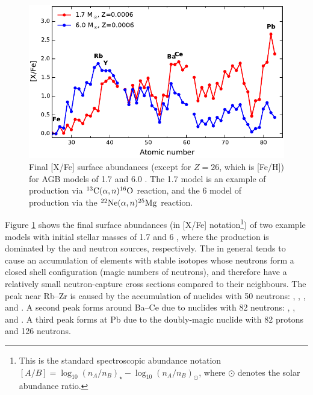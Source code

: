\begin{figure}
 \begin{center}\includegraphics[width=\textwidth]{fig-agbfinalabund.pdf}\end{center}
 \caption[{Final [X/Fe] surface abundances (except for $Z=26$, which is [Fe/H]) for AGB models of 1.7 and 6.0 \Msun.}]{Final [X/Fe] surface abundances (except for $Z=26$, which is [Fe/H]) for AGB models of 1.7 and 6.0 \Msun. The 1.7 \Msun model is an example of \sprocess production via $\mbox{${}^{13}{\text{C}}$}(\alpha,n)\mbox{${}^{16}{\text{O}}$}$ reaction, and the 6 \Msun model of production via the $\mbox{${}^{22}{\text{Ne}}$}(\alpha,n)\mbox{${}^{25}{\text{Mg}}$}$ reaction.}\label{fig:agbfinalabund}
\end{figure}

Figure \ref{fig:agbfinalabund} shows the final surface abundances (in [X/Fe] notation\footnote{This is the standard spectroscopic abundance notation $[A/B] = \log_{10} (n_A/n_B)_{\star} - \log_{10} (n_A/n_B)_{\odot}$, where $\odot$ denotes the solar abundance ratio.}) of two example models with initial stellar masses of 1.7 and 6 \Msun, where the \sprocess production is dominated by the  and  neutron sources, respectively. The \sprocess in general tends to cause an accumulation of elements with stable isotopes whose neutrons form a closed shell configuration (magic numbers of neutrons), and therefore have a relatively small neutron-capture cross sections compared to their neighbours. The peak near Rb--Zr is caused by the accumulation of nuclides with 50 neutrons: , , , and . A second peak forms around Ba--Ce due to nuclides with 82 neutrons: , , and . A third peak forms at Pb due to the doubly-magic  nuclide with 82 protons and 126 neutrons.

